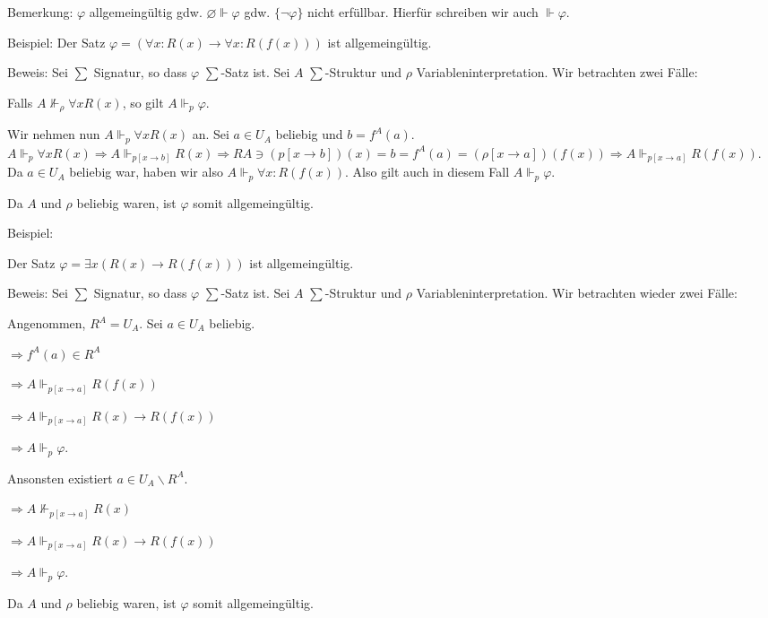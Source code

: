 \documentclass[a4paper]{article}
\begin{document}
\begin{multicols}{3}
  Bemerkung: $\varphi$ allgemeingültig gdw. $\varnothing\Vdash\varphi$ gdw. $\{\lnot\varphi\}$ nicht erfüllbar. Hierfür schreiben wir auch $\Vdash\varphi$.

  Beispiel: Der Satz $\varphi=(\forall x:R(x)\rightarrow\forall x:R(f(x)))$ ist allgemeingültig.

  Beweis: Sei $\sum$ Signatur, so dass $\varphi$  $\sum$-Satz ist. Sei $A$ $\sum$-Struktur und $\rho$ Variableninterpretation. Wir betrachten zwei Fälle:
  \begin{enumerate*}
    \item Falls $A\not\Vdash_\rho\forall x R(x)$, so gilt $A\Vdash_p\varphi$.
    \item Wir nehmen nun $A\Vdash_p\forall x R(x)$ an. Sei $a\in U_A$ beliebig und $b=f^A(a)$. $A\Vdash_p\forall x R(x) \Rightarrow A\Vdash_{p[x\rightarrow b]} R(x) \Rightarrow RA\owns (p[x\rightarrow b])(x) = b = f^A(a) = (\rho[x\rightarrow a])(f(x)) \Rightarrow A\Vdash_{p[x\rightarrow a]}R(f(x))$.
    Da $a\in U_A$ beliebig war, haben wir also $A\Vdash_p\forall x:R(f(x))$. Also gilt auch in diesem Fall $A\Vdash_p\varphi$.
  \end{enumerate*}
  Da $A$ und $\rho$ beliebig waren, ist $\varphi$ somit allgemeingültig.

  Beispiel:
  \begin{itemize*}
    \item Der Satz $\varphi =\exists x(R(x)\rightarrow R(f(x)))$ ist allgemeingültig.
    \item Beweis: Sei $\sum$ Signatur, so dass $\varphi$ $\sum$-Satz ist. Sei $A$ $\sum$-Struktur und $\rho$ Variableninterpretation. Wir betrachten wieder zwei Fälle:
  \end{itemize*}
  \begin{enumerate*}
    \item Angenommen, $R^A=U_A$. Sei $a\in U_A$ beliebig.
    \begin{itemize*}
      \item $\Rightarrow f^A(a)\in R^A$
      \item $\Rightarrow A\Vdash_{p[x\rightarrow a]} R(f(x))$
      \item $\Rightarrow A\Vdash_{p[x\rightarrow a]} R(x)\rightarrow R(f(x))$
      \item $\Rightarrow A\Vdash_p\varphi$.
    \end{itemize*}
    \item Ansonsten existiert $a\in U_A\backslash R^A$.
    \begin{itemize*}
      \item $\Rightarrow A\not\Vdash_{p[x\rightarrow a]} R(x)$
      \item $\Rightarrow A\Vdash_{p[x\rightarrow a]} R(x)\rightarrow R(f(x))$
      \item $\Rightarrow A\Vdash_p \varphi$.
    \end{itemize*}
  \end{enumerate*}
  Da $A$ und $\rho$ beliebig waren, ist $\varphi$ somit allgemeingültig.


\end{multicols}
\end{document}
